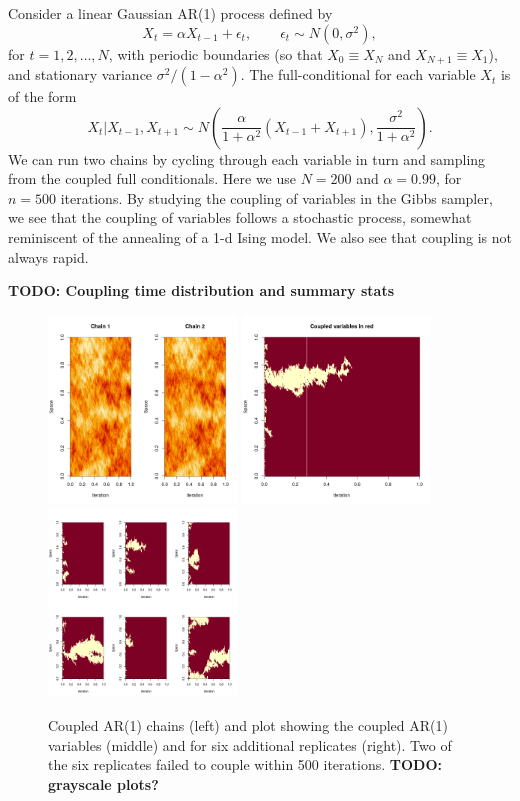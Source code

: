 \documentclass[11pt,a4paper]{article}
\begin{document}
Consider a linear Gaussian AR(1) process defined by
$$
X_t = \alpha X_{t-1} + \epsilon_t,\qquad \epsilon_t \sim N(0,\sigma^2),
$$
for $t=1,2,\ldots,N$, with periodic boundaries (so that $X_0\equiv X_N$ and $X_{N+1}\equiv X_1$), and stationary variance $\sigma^2/(1-\alpha^2)$. The full-conditional for each variable $X_t$ is of the form
$$
X_t|X_{t-1},X_{t+1} \sim N\left(\frac{\alpha}{1+\alpha^2}(X_{t-1}+X_{t+1}), \frac{\sigma^2}{1+\alpha^2} \right).
$$
We can run two chains by cycling through each variable in turn and sampling from the coupled full conditionals. Here we use $N=200$ and $\alpha=0.99$, for $n=500$ iterations. By studying the coupling of variables in the Gibbs sampler, we see that the coupling of variables follows a stochastic process, somewhat reminiscent of the annealing of a 1-d Ising model. We also see that coupling is not always rapid.

\textbf{TODO: Coupling time distribution and summary stats}

\begin{figure}
  \centerline{
    \includegraphics[height=5cm]{figs/ar1-chains}
    \qquad
    \includegraphics[height=5cm]{figs/ar1-coupled-1}
    \qquad
  \includegraphics[height=5cm]{figs/ar1-coupled-6}
  }
\caption{Coupled AR(1) chains (left) and plot showing the coupled AR(1) variables (middle) and for six additional replicates (right). Two of the six replicates failed to couple within 500 iterations. \textbf{TODO: grayscale plots?}}
\end{figure}
\end{document}

